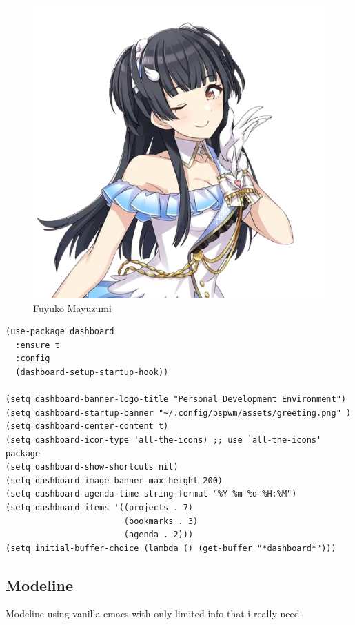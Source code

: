 \documentclass[11pt]{article}
\begin{document}
\begin{figure}[htbp]
\centering
\includegraphics[width=.9\linewidth]{./fuyuko.png}
\caption{Fuyuko Mayuzumi}
\end{figure}
\begin{verbatim}
(use-package dashboard
  :ensure t
  :config
  (dashboard-setup-startup-hook))

(setq dashboard-banner-logo-title "Personal Development Environment")
(setq dashboard-startup-banner "~/.config/bspwm/assets/greeting.png" )
(setq dashboard-center-content t)
(setq dashboard-icon-type 'all-the-icons) ;; use `all-the-icons' package
(setq dashboard-show-shortcuts nil) 
(setq dashboard-image-banner-max-height 200)
(setq dashboard-agenda-time-string-format "%Y-%m-%d %H:%M")
(setq dashboard-items '((projects . 7)
                        (bookmarks . 3)
                        (agenda . 2)))
(setq initial-buffer-choice (lambda () (get-buffer "*dashboard*")))
\end{verbatim}

\subsection{Modeline}
\label{sec:org804fce8}

Modeline using vanilla emacs with only limited info that i really need
\end{document}

